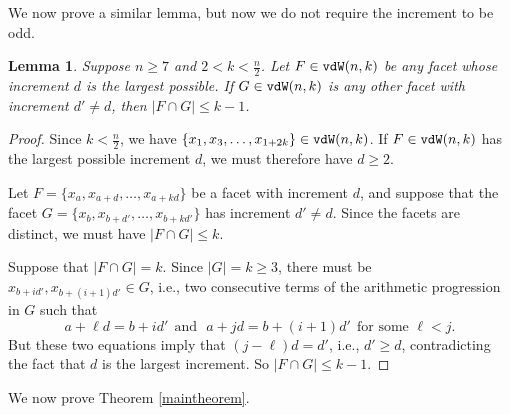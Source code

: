 \documentclass[12pt]{amsart}
\numberwithin{equation}{section}
\newtheorem{lemma}[theorem]{Lemma}
\theoremstyle{definition}
\begin{document}
We now prove a similar lemma, but now we do not require the increment
to be odd.

\begin{lemma}\label{mainlemma2}
Suppose $n \geq 7$ and $2 < k <\frac{n}{2}$.  
Let $F \in {\tt vdW}(n,k)$ be any facet whose increment
$d$ is the largest possible.
If $G \in {\tt vdW}(n,k)$ is any other facet with increment
$d' \neq d$, then $|F \cap G| \leq k-1$.
\end{lemma}

\begin{proof}
Since $k < \frac{n}{2}$, we have $\{x_1,x_3,\ldots,x_{1+2k}\}
\in {\tt vdW}(n,k)$.   If $F \in {\tt vdW}(n,k)$ has the largest possible
increment $d$, we must therefore have $d \geq 2$.

Let $F= \{x_a,x_{a+d},\ldots,x_{a+kd}\}$ be a facet with
increment $d$, and suppose that the facet  $G = \{x_b,x_{b+d'},\ldots,x_{b+kd'}\}$
has increment $d' \neq d$.  Since the
facets are distinct, we must have $|F \cap G| \leq k$.   

Suppose that $|F \cap G| = k$.  Since $|G| = k \geq 3$, there
must be $x_{b+id'},x_{b+(i+1)d'} \in G$, i.e., two consecutive 
terms of the arithmetic progression in $G$ such that 
\[a+\ell d = b+id' ~~\mbox{and} ~~~ a+jd = b+(i+1)d' 
~~\mbox{for some $\ell < j$.}\]  
But these two equations imply that $(j-\ell)d = d'$, i.e., $d' \geq d$,
contradicting the fact that $d$ is the largest increment.  So
$|F \cap G| \leq k-1$.
\end{proof}

We now prove Theorem \ref{maintheorem}.
\end{document}
